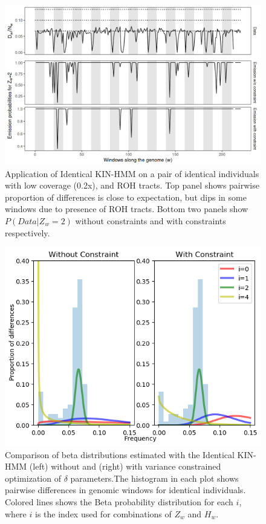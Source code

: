 \documentclass[12pt, letterpaper]{article}
\begin{document}
\begin{figure}[h!]
    \includegraphics[width=18cm]{supplementary_info/plots/contam0_inbred1_run57_coverage0.2_asc0_inputMode_hapProbs_fil0_pair0_15_relid_emissions_bnds.png}
    \centering
    \caption{Application of Identical KIN-HMM on a pair of identical individuals with low coverage (0.2x), and ROH tracts. Top panel shows pairwise proportion of differences is close to expectation, but dips in some windows due to presence of ROH tracts. Bottom two panels show $P(Data|Z_w=2)$ without constraints and with constraints respectively.}
    \label{figS3:bnds}
\end{figure}



\begin{figure}[h!]
    \includegraphics[width=18cm]{supplementary_info/plots/contam0_inbred1_run57_coverage0.2_asc0_inputMode_hapProbs_fil0_pair0_15_relid_betaplot1.png}
    \centering
    \caption{Comparison of beta distributions estimated with the Identical KIN-HMM (left) without and (right) with variance constrained optimization of $\delta$ parameters.The histogram in each plot shows pairwise differences in genomic windows for identical individuals. Colored lines shows the Beta probability distribution for each $i$, where $i$ is the index used for combinations of $Z_w$ and $H_w$.}
    \label{figS4:bndsbeta}
\end{figure}
\end{document}
